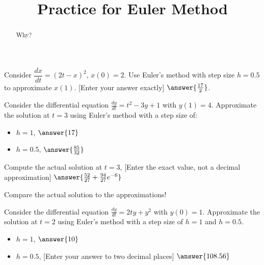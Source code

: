 \documentclass{ximera}
\title{Practice for Euler Method}
\begin{document}
\begin{abstract}
    Why?
\end{abstract}
\maketitle


\begin{exercise}
    Consider $\dfrac{dx}{dt} = {(2t-x)}^2$, $x(0)=2$.  Use Euler's method with step size $h=0.5$ to approximate $x(1)$. [Enter your answer exactly] $\answer{\frac{17}{2}}$.
\end{exercise}

\begin{exercise}
    Consider the differential equation $\frac{dy}{dt} = t^2 - 3y + 1$ with $y(1) = 4$. Approximate the solution at $t=3$ using Euler's method with a step size of: 
    \begin{itemize}
        \item $h=1$, $\answer{17}$
        \item $h=0.5$, $\answer{\frac{85}{32}}$
    \end{itemize}
    \begin{problem}
        Compute the actual solution at $t=3$, [Enter the exact value, not a decimal approximation] $\answer{\frac{52}{27} + \frac{94}{27}e^{-6}}$
        \begin{feedback}[correct]
            Compare the actual solution to the approximations!
        \end{feedback}
    \end{problem}
\end{exercise}

\begin{exercise}
    Consider the differential equation $\frac{dy}{dt} = 2ty + y^2$ with $y(0) = 1$. Approximate the solution at $t=2$ using Euler's method with a step size of $h=1$ and $h=0.5$.
    \begin{itemize}
        \item $h=1$, $\answer{10}$
        \item $h=0.5$, [Enter your answer to two decimal places] $\answer{108.56}$
    \end{itemize}
\end{exercise}
\end{document}
